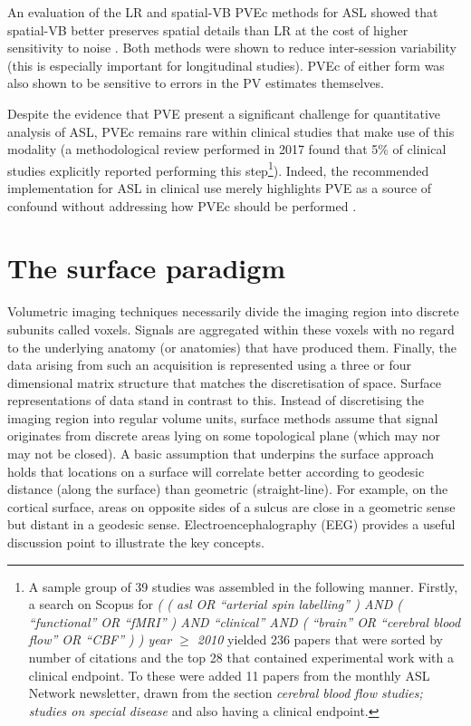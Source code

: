 \documentclass[12pt]{report}
\begin{document}
An evaluation of the LR and spatial-VB PVEc methods for ASL showed that spatial-VB better preserves spatial details than LR at the cost of higher sensitivity to noise \cite{Zhao2017a}. Both methods were shown to reduce inter-session variability (this is especially important for longitudinal studies). PVEc of either form was also shown to be sensitive to errors in the PV estimates themselves. 

Despite the evidence that PVE present a significant challenge for quantitative analysis of ASL, PVEc remains rare within clinical studies that make use of this modality (a methodological review performed in 2017 found that 5\% of clinical studies explicitly reported performing this step\footnote{A sample group of 39 studies was assembled in the following manner. Firstly, a search on Scopus for \textit{( ( asl OR “arterial spin labelling” ) AND ( “functional” OR “fMRI” ) AND “clinical” AND ( “brain” OR “cerebral blood flow” OR “CBF” ) ) year $\geq$ 2010} yielded 236 papers that were sorted by number of citations and the top 28 that contained experimental work with a clinical endpoint. To these were added 11 papers from the monthly ASL Network newsletter, drawn from the section \textit{cerebral blood flow studies; studies on special disease} and also having a clinical endpoint.}). Indeed, the recommended implementation for ASL in clinical use merely highlights PVE as a source of confound without addressing how PVEc should be performed \cite{Alsop2015}. 


\section{The surface paradigm}

Volumetric imaging techniques necessarily divide the imaging region into discrete subunits called voxels. Signals are aggregated within these voxels with no regard to the underlying anatomy (or anatomies) that have produced them. Finally, the data arising from such an acquisition is represented using a three or four dimensional matrix structure that matches the discretisation of space. Surface representations of data stand in contrast to this. Instead of discretising the imaging region into regular volume units, surface methods assume that signal originates from discrete areas lying on some topological plane (which may nor may not be closed). A basic assumption that underpins the surface approach holds that locations on a surface will correlate better according to geodesic distance (along the surface) than geometric (straight-line). For example, on the cortical surface, areas on opposite sides of a sulcus are close in a geometric sense but distant in a geodesic sense. Electroencephalography (EEG) provides a useful discussion point to illustrate the key concepts. 
\end{document}
